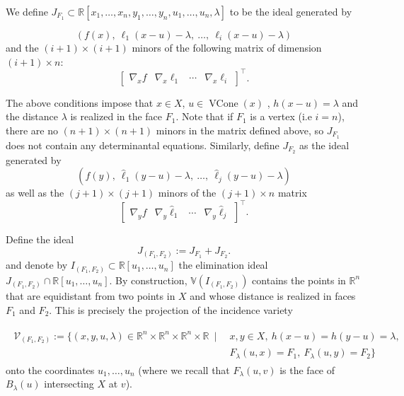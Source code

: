 \documentclass{article}
\numberwithin{theorem}{section}
\theoremstyle{definition}
\theoremstyle{example_contd}
\newcommand{\RR}{\mathbb{R}}
\renewcommand{\l}{\lambda}
\newcommand{\V}{{\mathbb{V}}}
\DeclareMathOperator{\vc}{{VCone}}
\newcommand{\julia}[1]{{\color{JungleGreen} Julia: [#1]}}
\newcommand{\nidhi}[1]{{\color{Orchid} \sf  Nidhi: [#1]}}
\begin{document}
We define $J_{F_1}\subset \RR[x_1,\ldots,x_n,y_1,\ldots,y_n,u_1,\ldots,u_n,\lambda]$ to be the ideal generated by 

\begin{equation*}
   ( f(x), \ \ell_1(x-u)-\lambda, \ \ldots , \ \ell_i(x-u)-\lambda )
\end{equation*}
and the  $(i+1) \times (i+1)$ minors of the following matrix of dimension $(i+1) \times n$:
\begin{equation*} %
	\begin{bmatrix}
		\nabla_x f &
		\nabla_x \ell_1 &
		\cdots &
		\nabla_x \ell_i
	\end{bmatrix}^{\top}.
\end{equation*}

The above conditions impose that $x\in X$, $u\in\vc(x)$ , $h(x-u)=\l$  and the distance $\lambda$ is realized in the face $F_1$. 
Note that if $F_1$ is a vertex (i.e $i=n$), there are no $(n+1) \times (n+1)$ minors in the matrix defined above, so $J_{F_1}$ does not contain any determinantal equations.
Similarly, define $J_{F_2}$ as the ideal generated by 
\begin{equation*}
   ( f(y), \  \hat{\ell}_1(y - u) - \lambda , \  \ldots, \ \hat{\ell}_j(y - u) - \lambda )
\end{equation*} 
as well as the $(j + 1) \times (j + 1)$ minors of the $(j+1) \times n$ matrix 
\begin{equation*} %
	\begin{bmatrix}
		\nabla_y f &
		\nabla_y \hat{\ell}_1 &
		\cdots &
		\nabla_y \hat{\ell}_j
	\end{bmatrix}^{\top}.
\end{equation*}

Define the ideal 
\begin{equation}\label{eq:incidenceideal}
	J_{(F_1,F_2)}:=J_{F_1}+J_{F_2}.
\end{equation}
and denote by $I_{(F_1,F_2)}\subset \RR[u_1,\ldots,u_n]$ the elimination ideal $J_{(F_1,F_2)}\cap \RR[u_1,\ldots,u_n].$ By construction, $\V(I_{(F_1,F_2)})$ contains the points in $\RR^n$ that are equidistant from two points in $X$ and whose distance is realized in faces $F_1$ and $F_2$. This is precisely the projection of the incidence variety

\begin{align}\begin{split}\label{eq:IV}
	\mathcal{V}_{(F_1,F_2)}:=\{(x,y,u,\lambda)\in \RR^n\times\RR^n\times \RR^n \times \RR~\mid~   &x,y\in X, \  h(x-u)=h(y-u)=\lambda, \\ &F_\l(u,x)=F_1,\ F_\l(u,y)=F_2 \}
\end{split}\end{align}
\noindent onto the coordinates $u_1,\ldots, u_n$ (where we recall that $F_\l(u,v)$ is the face of $B_\lambda (u)$ intersecting $X$ at $v$). 
\end{document}

